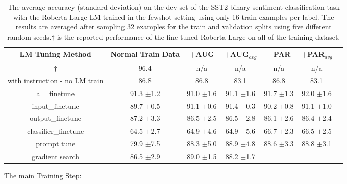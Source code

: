 \documentclass[11pt]{article}
\begin{document}
\begin{table*}
\centering
\caption{The average accuracy (standard deviation) on the dev set of the SST2 binary sentiment classification task with the Roberta-Large LM trained in the fewshot setting using only 16 train examples per label. The results are averaged after sampling 32 examples for the train and validation splits using five different random seeds.$\dagger$ is the reported performance of the fine-tuned Roberta-Large on all of the training dataset.}

\begin{tabular}{c | c | c | c | c | c | c}
\hline
LM Tuning Method & Normal Train Data & +AUG & +AUG$_{avg}$ & +PAR & +PAR$_{avg}$ \\
\hline
\cite{DBLP:journals/corr/abs-1907-11692}$\dagger$ & 96.4 & n/a & n/a & n/a & n/a\\
\hline
with instruction - no LM train & 86.8 & 86.8 & 83.1 & 86.8 & 83.1\\
\hline
all\_finetune & 91.3 \small$\pm$\small1.2 & 91.0 \small$\pm$\small1.6 & 91.1 \small$\pm$\small1.6 & {\color{green}91.7} \small$\pm$\small1.3 & {\color{green}92.0} \small$\pm$\small1.6\\
input\_finetune & 89.7 \small$\pm$\small0.5 & {\color{green}91.1} \small$\pm$\small0.6 & {\color{green}91.4} \small$\pm$\small0.3 & {\color{green}90.2} \small$\pm$\small0.8 & {\color{green}91.1} \small$\pm$\small1.0\\
output\_finetune & 87.2 \small$\pm$\small3.3 & 86.5 \small$\pm$\small2.5 & 86.5 \small$\pm$\small2.8 & 86.1 \small$\pm$\small2.6 & 86.4 \small$\pm$\small2.4\\
classifier\_finetune & 64.5 \small$\pm$\small2.7 &  64.9 \small$\pm$\small4.6 & 64.9 \small$\pm$\small5.6 & {\color{green}66.7} \small$\pm$\small2.3 & {\color{green}66.5} \small$\pm$\small2.5 \\
\hline
prompt tune & 79.9 \small$\pm$\small7.5 & {\color{green}88.3} \small$\pm$\small5.0 & {\color{green}88.9} \small$\pm$\small4.8 & {\color{green}88.6} \small$\pm$\small3.3 & {\color{green}88.8} \small$\pm$\small3.1\\
gradient search & 86.5 \small$\pm$\small2.9 & {\color{green}89.0} \small$\pm$\small1.5 & {\color{green}88.2} \small$\pm$\small1.7 &
\end{tabular}
\label{sst2}
\end{table*}


The main Training Step:
\end{document}
